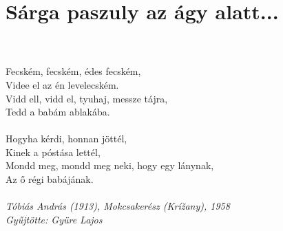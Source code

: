 \section{Sárga paszuly az ágy alatt...}
\\\\
Fecském, fecském, édes fecském,\\
Videe el az én levelecském.\\
Vidd ell, vidd el, tyuhaj, messze tájra,\\
Tedd a babám ablakába.\\\\
Hogyha kérdi, honnan jöttél,\\
Kinek a póstása lettél,\\
Mondd meg, mondd meg neki, hogy egy lánynak,\\
Az ő régi babájának.\\\\
\textit{Tóbiás András (1913), Mokcsakerész (Krížany), 1958\\ Gyűjtötte: Gyüre Lajos}
